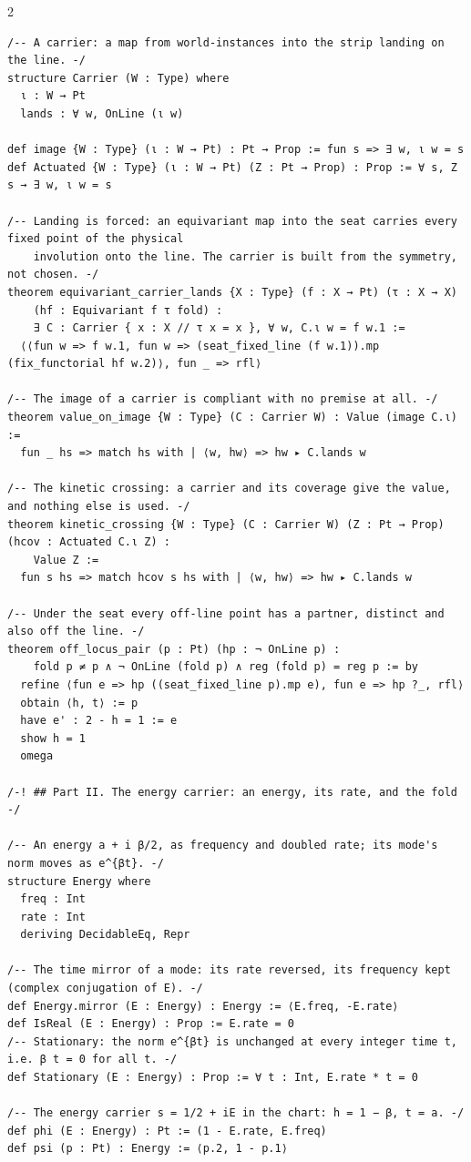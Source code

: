 \documentclass[10pt]{article}
\begin{document}
\begin{multicols}{2}
\begin{Verbatim}[fontsize=\fontsize{5.9}{6.8}\selectfont,breaklines,breakanywhere,breaksymbolleft={}]
/-- A carrier: a map from world-instances into the strip landing on the line. -/
structure Carrier (W : Type) where
  ι : W → Pt
  lands : ∀ w, OnLine (ι w)

def image {W : Type} (ι : W → Pt) : Pt → Prop := fun s => ∃ w, ι w = s
def Actuated {W : Type} (ι : W → Pt) (Z : Pt → Prop) : Prop := ∀ s, Z s → ∃ w, ι w = s

/-- Landing is forced: an equivariant map into the seat carries every fixed point of the physical
    involution onto the line. The carrier is built from the symmetry, not chosen. -/
theorem equivariant_carrier_lands {X : Type} (f : X → Pt) (τ : X → X)
    (hf : Equivariant f τ fold) :
    ∃ C : Carrier { x : X // τ x = x }, ∀ w, C.ι w = f w.1 :=
  ⟨⟨fun w => f w.1, fun w => (seat_fixed_line (f w.1)).mp (fix_functorial hf w.2)⟩, fun _ => rfl⟩

/-- The image of a carrier is compliant with no premise at all. -/
theorem value_on_image {W : Type} (C : Carrier W) : Value (image C.ι) :=
  fun _ hs => match hs with | ⟨w, hw⟩ => hw ▸ C.lands w

/-- The kinetic crossing: a carrier and its coverage give the value, and nothing else is used. -/
theorem kinetic_crossing {W : Type} (C : Carrier W) (Z : Pt → Prop) (hcov : Actuated C.ι Z) :
    Value Z :=
  fun s hs => match hcov s hs with | ⟨w, hw⟩ => hw ▸ C.lands w

/-- Under the seat every off-line point has a partner, distinct and also off the line. -/
theorem off_locus_pair (p : Pt) (hp : ¬ OnLine p) :
    fold p ≠ p ∧ ¬ OnLine (fold p) ∧ reg (fold p) = reg p := by
  refine ⟨fun e => hp ((seat_fixed_line p).mp e), fun e => hp ?_, rfl⟩
  obtain ⟨h, t⟩ := p
  have e' : 2 - h = 1 := e
  show h = 1
  omega

/-! ## Part II. The energy carrier: an energy, its rate, and the fold -/

/-- An energy a + i β/2, as frequency and doubled rate; its mode's norm moves as e^{βt}. -/
structure Energy where
  freq : Int
  rate : Int
  deriving DecidableEq, Repr

/-- The time mirror of a mode: its rate reversed, its frequency kept (complex conjugation of E). -/
def Energy.mirror (E : Energy) : Energy := ⟨E.freq, -E.rate⟩
def IsReal (E : Energy) : Prop := E.rate = 0
/-- Stationary: the norm e^{βt} is unchanged at every integer time t, i.e. β t = 0 for all t. -/
def Stationary (E : Energy) : Prop := ∀ t : Int, E.rate * t = 0

/-- The energy carrier s = 1/2 + iE in the chart: h = 1 − β, t = a. -/
def phi (E : Energy) : Pt := (1 - E.rate, E.freq)
def psi (p : Pt) : Energy := ⟨p.2, 1 - p.1⟩


\end{Verbatim}
\end{multicols}
\end{document}
